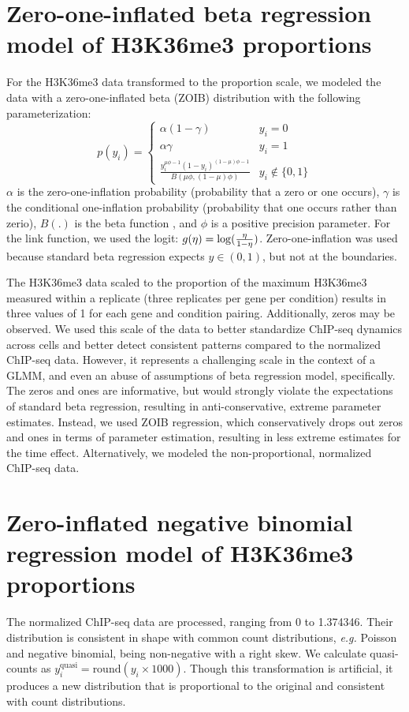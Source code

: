 \documentclass[12pt]{extarticle}
\newcommand{\eg}{\emph{e.g.}\xspace}
\begin{document}
\section*{Zero-one-inflated beta regression model of H3K36me3 proportions}
For the H3K36me3 data transformed to the proportion scale, we modeled the data with a zero-one-inflated beta (ZOIB) distribution with the following parameterization:
\begin{equation}
	p(y_{i}) = \begin{cases} 
      			\alpha(1 - \gamma) & y_{i} = 0 \\
      			\alpha \gamma & y_{i} = 1 \\
     			 \frac{y_{i}^{\mu\phi - 1}(1 - y_{i})^{(1 - \mu)\phi - 1}}{B(\mu \phi, (1 - \mu)\phi)} & y_{i} \not\in \{0, 1\}
   		\end{cases}
\end{equation}
$\alpha$ is the zero-one-inflation probability (probability that a zero or one occurs), $\gamma$ is the conditional one-inflation probability (probability that one occurs rather than zerio), $B(.)$ is the beta function \cite{Casella2002}, and $\phi$ is a positive precision parameter. For the link function, we used the logit: $g(\eta)= \log\large(\frac{\eta}{1 - \eta}\large)$. Zero-one-inflation was used because standard beta regression expects $y \in (0, 1)$, but not at the boundaries.

The H3K36me3 data scaled to the proportion of the maximum H3K36me3 measured within a replicate (three replicates per gene per condition) results in three values of 1 for each gene and condition pairing. Additionally, zeros may be observed. We used this scale of the data to better standardize ChIP-seq dynamics across cells and better detect consistent patterns compared to the normalized ChIP-seq data. However, it represents a challenging scale in the context of a GLMM, and even an abuse of assumptions of beta regression model, specifically. The zeros and ones are informative, but would strongly violate the expectations of standard beta regression, resulting in anti-conservative, extreme parameter estimates. Instead, we used ZOIB regression, which conservatively drops out zeros and ones in terms of parameter estimation, resulting in less extreme estimates for the time effect. Alternatively, we modeled the non-proportional, normalized ChIP-seq data.

\section*{Zero-inflated negative binomial regression model of H3K36me3 proportions}
The normalized ChIP-seq data are processed, ranging from 0 to 1.374346. Their distribution is consistent in shape with common count distributions, \eg Poisson and negative binomial, being non-negative with a right skew. We calculate quasi-counts as $y_{i}^{\text{quasi}} = \text{round}(y_{i} \times 1000)$. Though this transformation is artificial, it produces a new distribution that is proportional to the original and consistent with count distributions.
\end{document}
